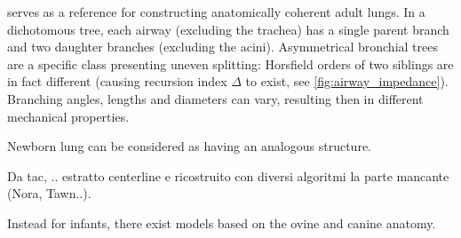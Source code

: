
 serves as a reference for
constructing anatomically coherent adult lungs. In a dichotomous tree,
each airway (excluding the trachea) has a single parent branch and two
daughter branches (excluding the acini).  Asymmetrical bronchial trees
are a specific class presenting uneven splitting: Horsfield orders of
two siblings are in fact different (causing recursion index $\Delta$
to exist, see \cref{fig:airway_impedance}).  Branching angles, lengths
and diameters can vary, resulting then in different mechanical
properties.

Newborn lung can be considered as having an analogous structure.

Da tac, .. estratto centerline e ricostruito con diversi algoritmi la parte
mancante (Nora, Tawn..).



Instead for infants, there exist models based on the
ovine\cite{al-jumaily2011} and canine\cite{herrmann2016} anatomy.

